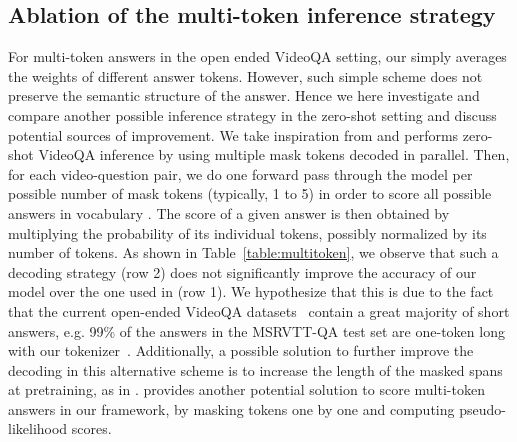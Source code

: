 \subsection{Ablation of the multi-token inference strategy}\label{sec:multitoken}
For multi-token answers in the open ended VideoQA setting, our \model{} simply averages the weights of different answer tokens.
However, such simple scheme does not preserve the semantic structure of the answer.
Hence we here investigate and compare another possible inference strategy in the zero-shot setting and discuss potential sources of improvement.
We take inspiration from \cite{jiang2020x} and performs zero-shot VideoQA inference by using multiple mask tokens decoded in parallel. 
Then, for each video-question pair, we do one forward pass through the model per possible number of mask tokens (typically, 1 to 5) in order to score all possible answers in vocabulary . 
The score of a given answer is then obtained by multiplying the probability of its individual tokens, possibly normalized by its number of tokens. 
As shown in Table~\ref{table:multitoken}, we observe that such a decoding strategy (row 2) does not significantly improve the accuracy of our model over the one used in \model{} (row 1). 
We hypothesize that this is due to the fact that the current open-ended VideoQA datasets~\cite{jang2017tgif, xu2017video, yang2021just, yu2019activitynet} contain a great majority of short answers, e.g. 99\% of the answers in the MSRVTT-QA test set are one-token long with our tokenizer~\cite{kudo2018sentencepiece}. 
Additionally, a possible solution to further improve the decoding in this alternative scheme is to increase the length of the masked spans at pretraining, as in \cite{joshi2020spanbert}. 
\cite{salazar2019masked} provides another potential solution to score multi-token answers in our framework, by masking tokens one by one and computing pseudo-likelihood scores.

